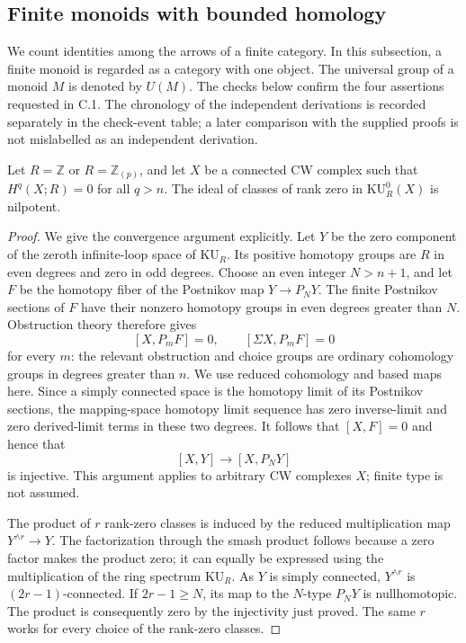 \subsection{Finite monoids with bounded homology}

We count identities among the arrows of a finite category.  In this
subsection, a finite monoid is regarded as a category with one object.
The universal group of a monoid $M$ is denoted by $U(M)$.
The checks below confirm the four assertions requested in C.1.  The
chronology of the independent derivations is recorded separately in the
check-event table; a later comparison with the supplied proofs is not
mislabelled as an independent derivation.

\begin{lemma}
\label{CP2:C-Knilpotence}
Let $R=\mathbb Z$ or $R=\mathbb Z_{(p)}$, and let $X$ be a connected CW
complex such that $H^q(X;R)=0$ for all $q>n$.  The ideal of classes of
rank zero in $\mathrm{KU}_R^0(X)$ is nilpotent.
\end{lemma}
\begin{proof}
We give the convergence argument explicitly.  Let $Y$ be the zero
component of the zeroth infinite-loop space of $\mathrm{KU}_R$.
Its positive homotopy groups are $R$ in even degrees and zero in odd
degrees.  Choose an even integer $N>n+1$, and let $F$ be the homotopy
fiber of the Postnikov map $Y\to P_NY$.
The finite Postnikov sections of $F$ have their nonzero homotopy groups
in even degrees greater than $N$.  Obstruction theory therefore gives
\[
 [X,P_mF]=0,\qquad [\Sigma X,P_mF]=0
\]
for every $m$: the relevant obstruction and choice groups are ordinary
cohomology groups in degrees greater than $n$.  We use reduced
cohomology and based maps here.  Since a simply connected space is the
homotopy limit of its Postnikov sections, the mapping-space homotopy
limit sequence has zero inverse-limit and zero derived-limit terms in
these two degrees.  It follows that $[X,F]=0$ and hence that
\[
 [X,Y]\longrightarrow [X,P_NY]
\]
is injective.  This argument applies to arbitrary CW complexes $X$;
finite type is not assumed.

The product of $r$ rank-zero classes is induced by the reduced
multiplication map $Y^{\wedge r}\to Y$.  The factorization through the
smash product follows because a zero factor makes the product zero;
it can equally be expressed using the multiplication of the ring
spectrum $\mathrm{KU}_R$.  As $Y$ is simply connected,
$Y^{\wedge r}$ is $(2r-1)$-connected.  If $2r-1\ge N$, its map to the
$N$-type $P_NY$ is nullhomotopic.  The product is consequently zero by
the injectivity just proved.  The same $r$ works for every choice of
the rank-zero classes.
\end{proof}

